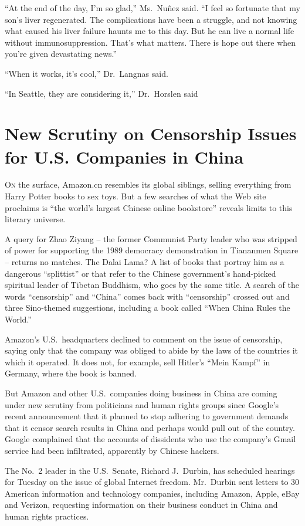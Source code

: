 ﻿\documentclass[12pt]{article}
\begin{document}
``At the end of the day, I'm so glad,'' Ms.~Nu\~{n}ez said. ``I feel so fortunate that my son's
liver regenerated. The complications have been a struggle, and not knowing what caused his liver
failure haunts me to this day. But he can live a normal life without immunosuppression. That's what
matters. There is hope out there when you're given devastating news.''

``When it works, it's cool,'' Dr.~Langnas said.

``In Seattle, they are considering it,'' Dr.~Horslen said

\section{New Scrutiny on Censorship Issues for U.S. Companies in China}

\lettrine{O}{n} the surface, Amazon.cn resembles its global siblings,
selling everything from Harry Potter books to sex toys. But a few searches of what the Web site
proclaims is ``the world's largest Chinese online bookstore'' reveals limits to this literary
universe.

A query for Zhao Ziyang -- the former Communist Party leader who was stripped of power for
supporting the 1989 democracy demonstration in Tiananmen Square -- returns no matches. The Dalai
Lama? A list of books that portray him as a dangerous ``splittist'' or that refer to the Chinese
government's hand-picked spiritual leader of Tibetan Buddhism, who goes by the same title. A search
of the words ``censorship'' and ``China'' comes back with ``censorship'' crossed out and three
Sino-themed suggestions, including a book called ``When China Rules the World.''

Amazon's U.S.~headquarters declined to comment on the issue of censorship, saying only that the
company was obliged to abide by the laws of the countries it which it operated. It does not, for
example, sell Hitler's ``Mein Kampf'' in Germany, where the book is banned.

But Amazon and other U.S.~companies doing business in China are coming under new scrutiny from
politicians and human rights groups since Google's recent announcement that it planned to stop
adhering to government demands that it censor search results in China and perhaps would pull out of
the country. Google complained that the accounts of dissidents who use the company's Gmail service
had been infiltrated, apparently by Chinese hackers.

The No.~2 leader in the U.S.~Senate, Richard J.~Durbin, has scheduled hearings for Tuesday on the
issue of global Internet freedom. Mr.~Durbin sent letters to 30 American information and technology
companies, including Amazon, Apple, eBay and Verizon, requesting information on their business
conduct in China and human rights practices.
\end{document}
